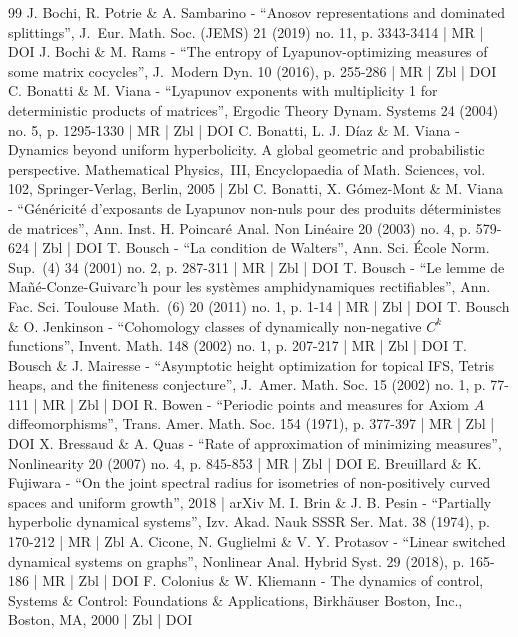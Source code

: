 \documentclass[10pt]{amsart}
\theoremstyle{plain}
\theoremstyle{definition}
\begin{document}
\begin{thebibliography}{99}
J. Bochi, R. Potrie \& A. Sambarino - “Anosov representations and dominated splittings”, J. Eur. Math. Soc. (JEMS) 21 (2019) no. 11, p. 3343-3414 | MR | DOI
J. Bochi \& M. Rams - “The entropy of Lyapunov-optimizing measures of some matrix cocycles”, J. Modern Dyn. 10 (2016), p. 255-286 | MR | Zbl | DOI
C. Bonatti \& M. Viana - “Lyapunov exponents with multiplicity 1 for deterministic products of matrices”, Ergodic Theory Dynam. Systems 24 (2004) no. 5, p. 1295-1330 | MR | Zbl | DOI
C. Bonatti, L. J. Díaz \& M. Viana - Dynamics beyond uniform hyperbolicity. A global geometric and probabilistic perspective. Mathematical Physics, III, Encyclopaedia of Math. Sciences, vol. 102, Springer-Verlag, Berlin, 2005 | Zbl
C. Bonatti, X. Gómez-Mont \& M. Viana - “Généricité d’exposants de Lyapunov non-nuls pour des produits déterministes de matrices”, Ann. Inst. H. Poincaré Anal. Non Linéaire 20 (2003) no. 4, p. 579-624 | Zbl | DOI
T. Bousch - “La condition de Walters”, Ann. Sci. École Norm. Sup. (4) 34 (2001) no. 2, p. 287-311 | MR | Zbl | DOI
T. Bousch - “Le lemme de Mañé-Conze-Guivarc’h pour les systèmes amphidynamiques rectifiables”, Ann. Fac. Sci. Toulouse Math. (6) 20 (2011) no. 1, p. 1-14 | MR | Zbl | DOI
T. Bousch \& O. Jenkinson - “Cohomology classes of dynamically non-negative $C^k$ functions”, Invent. Math. 148 (2002) no. 1, p. 207-217 | MR | Zbl | DOI
T. Bousch \& J. Mairesse - “Asymptotic height optimization for topical IFS, Tetris heaps, and the finiteness conjecture”, J. Amer. Math. Soc. 15 (2002) no. 1, p. 77-111 | MR | Zbl | DOI
R. Bowen - “Periodic points and measures for Axiom $A$ diffeomorphisms”, Trans. Amer. Math. Soc. 154 (1971), p. 377-397 | MR | Zbl | DOI
X. Bressaud \& A. Quas - “Rate of approximation of minimizing measures”, Nonlinearity 20 (2007) no. 4, p. 845-853 | MR | Zbl | DOI
E. Breuillard \& K. Fujiwara - “On the joint spectral radius for isometries of non-positively curved spaces and uniform growth”, 2018 | arXiv
M. I. Brin \& J. B. Pesin - “Partially hyperbolic dynamical systems”, Izv. Akad. Nauk SSSR Ser. Mat. 38 (1974), p. 170-212 | MR | Zbl
A. Cicone, N. Guglielmi \& V. Y. Protasov - “Linear switched dynamical systems on graphs”, Nonlinear Anal. Hybrid Syst. 29 (2018), p. 165-186 | MR | Zbl | DOI
F. Colonius \& W. Kliemann - The dynamics of control, Systems \& Control: Foundations \& Applications, Birkhäuser Boston, Inc., Boston, MA, 2000 | Zbl | DOI

\end{thebibliography}
\end{document}
